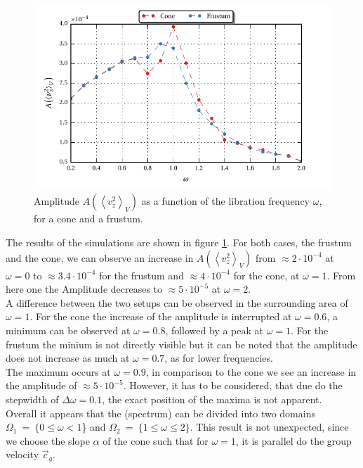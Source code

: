 \begin{figure}[!bp]
  \centering
  \includegraphics{gfx/cone/experiment/experiment.pdf}
  \caption{Amplitude $A\left(\left<v^2_z\right>_V\right)$ as a function of the libration frequency $\omega$,
            for a cone and a frustum.  \label{fig:cone_expseries} }
\end{figure}

The results of the simulations are shown in figure \ref{fig:cone_expseries}.
For both cases, the frustum and the cone, we can observe an increase in $A\left(\left<v^2_z\right>_V\right)$
from $\approx 2\cdot10^{-4}$ at $\omega=0$ to  $\approx 3.4\cdot10^{-4}$ for the frustum and $\approx 4\cdot10^{-4}$ for the cone,  at $\omega=1$.
From here one the Amplitude decreases to $\approx 5\cdot10^{-5}$ at $\omega=2$.\\
A difference between the two setups can be observed in the surrounding area of $\omega=1$.
For the cone the increase of the amplitude is interrupted at $\omega=0.6$, a minimum can be observed at $\omega=0.8$, followed by
a peak at $\omega=1$. For the frustum the minium is not directly visible but it can be noted that the
amplitude does not increase as much at $\omega=0.7$, as for lower frequencies.\\
The maximum occurs at $\omega=0.9$, in comparison to the cone we see an increase in the amplitude of $\approx 5\cdot10^{-5}$.
However, it has to be considered, that due do the stepwidth of $\Delta \omega = 0.1$, the exact position of the maxima is
not apparent.\\
Overall it appears that the (spectrum) can be divided into two domains $\Omega_1~=~\{0\leq\omega<1$\} and $\Omega_2~=~\{1\leq\omega\leq2\}$.
This result is not unexpected, since we choose the slope $\alpha$ of the cone such that for $\omega=1$, it is parallel
do the group velocity $\vec{c}_{g}$.

